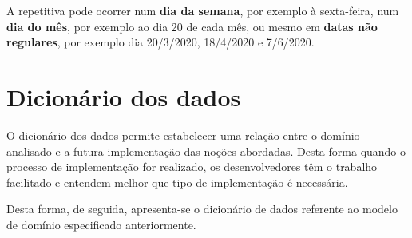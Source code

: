 \hspace{5mm} A repetitiva pode ocorrer num \textbf{dia da semana}, por exemplo à sexta-feira, num \textbf{dia do mês}, por exemplo ao dia 20 de cada mês, ou mesmo em \textbf{datas não regulares}, por exemplo dia 20/3/2020, 18/4/2020 e 7/6/2020.  

\section{Dicionário dos dados}

\hspace{5mm} O dicionário dos dados permite estabelecer uma relação entre o domínio analisado e a futura implementação das noções abordadas. Desta forma quando o processo de implementação for realizado, os desenvolvedores têm o trabalho facilitado e entendem melhor que tipo de implementação é necessária.

\hspace{5mm} Desta forma, de seguida, apresenta-se o dicionário de dados referente ao modelo de domínio especificado anteriormente.

